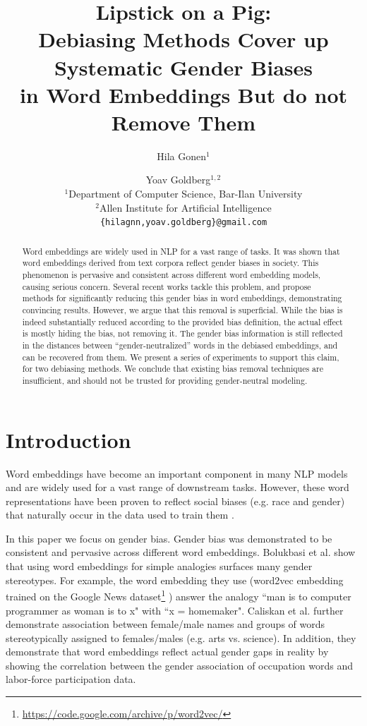 \documentclass[11pt,a4paper]{article}
\title{Lipstick on a Pig: \\Debiasing Methods Cover up Systematic Gender Biases\\ in Word Embeddings But do not Remove Them}
\author{Hila Gonen$^1$ \and Yoav Goldberg$^{1,2}$ \\
	$^1$Department of Computer Science,  Bar-Ilan University \\
	$^2$Allen Institute for Artificial Intelligence \\
	{\tt \{hilagnn,yoav.goldberg\}@gmail.com} \\
}
\date{}
\begin{document}
	\maketitle
	\begin{abstract}
		Word embeddings are widely used in NLP for a vast range of tasks. It was shown that word embeddings derived from text corpora reflect gender biases in society. This phenomenon is pervasive and consistent across different word embedding models, causing serious concern. Several recent works tackle this problem, and propose methods for significantly reducing this gender bias in word embeddings, demonstrating convincing results. 
		However, we argue that this removal is superficial. While the bias is indeed substantially reduced according to the provided bias definition, the actual effect is mostly hiding the bias, not removing it. The gender bias information is still reflected in the distances between ``gender-neutralized'' words in the debiased embeddings, and can be recovered from them. We present a series of experiments to support this claim, for two debiasing methods. We conclude that existing bias removal techniques are insufficient, and should not be trusted for providing gender-neutral modeling.
	\end{abstract}
	
	\section{Introduction}
	\label{Introduction}

	Word embeddings have become an important component in many NLP models and are widely used for a vast range of downstream tasks. However, these word representations have been proven to reflect social biases (e.g. race and gender) that naturally occur in the data used to train them \cite{CBN17,GSJ18}. 
	
	In this paper we focus on gender bias. Gender bias was demonstrated to be consistent and pervasive across different word embeddings. Bolukbasi et al. \citeyearpar{BCZ16} show that using word embeddings for simple analogies surfaces many gender stereotypes. For example, the word embedding they use (word2vec  embedding trained on the Google News dataset\footnote{\scriptsize{\url{https://code.google.com/archive/p/word2vec/}}} \cite{MCC13}) answer the analogy ``man is to computer programmer as woman is to x" with ``x = homemaker".	Caliskan et al. \citeyearpar{CBN17} further demonstrate association between female/male names and groups of words stereotypically assigned to females/males (e.g. arts vs. science). In addition, they demonstrate that word embeddings reflect actual gender gaps in reality by showing the correlation between the gender association of occupation words and labor-force participation data.
	
\end{document}
